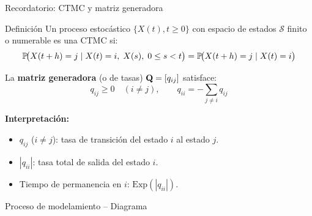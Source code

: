 \documentclass[aspectratio=1610, 9pt]{beamer}
\begin{document}
\begin{frame}{Recordatorio: CTMC y matriz generadora}
\begin{block}{Definición}
Un proceso estocástico $\{X(t), t \ge 0\}$ con espacio de estados $\mathcal{S}$ finito o numerable es una CTMC si:
\[
\mathbb{P}\!\big(X(t+h)=j \mid X(t)=i,\; X(s),\; 0 \le s < t\big) = \mathbb{P}\!\big(X(t+h)=j \mid X(t)=i\big)
\]
\end{block}
\vspace{4pt}

La \textbf{matriz generadora} (o de tasas) $\mathbf{Q} = [q_{ij}]$ satisface:
\[
q_{ij} \ge 0 \quad (i \neq j), \qquad q_{ii} = -\sum_{j \neq i} q_{ij}
\]

\vspace{4pt}
\textbf{Interpretaci\'on:}
\begin{itemize}
    \item $q_{ij}$ ($i\neq j$): tasa de transici\'on del estado $i$ al estado $j$.
    \item $|q_{ii}|$: tasa total de salida del estado $i$.
    \item Tiempo de permanencia en $i$: $\text{Exp}(|q_{ii}|)$.
\end{itemize}
\end{frame}

\begin{frame}{Proceso de modelamiento -- Diagrama}
\centering
{}
\end{frame}
\end{document}
